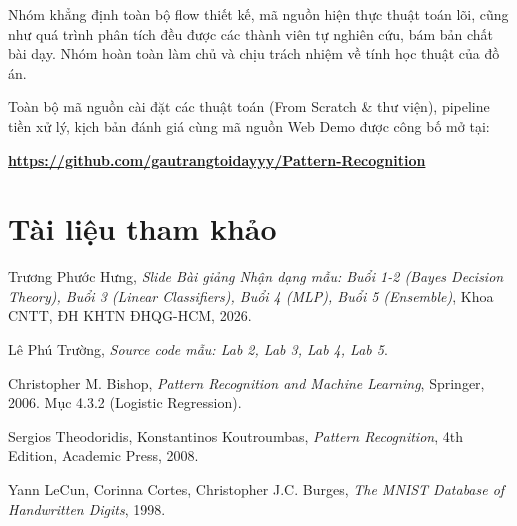\documentclass[11pt,a4paper]{article}
\begin{document}
Nhóm khẳng định toàn bộ flow thiết kế, mã nguồn hiện thực thuật toán lõi, cũng như quá trình phân tích đều được các thành viên tự nghiên cứu, bám bản chất bài dạy. Nhóm hoàn toàn làm chủ và chịu trách nhiệm về tính học thuật của đồ án.

\begin{tcolorbox}[colback=gray!8, colframe=black!75, title=\textbf{Mã nguồn và Tài nguyên Thực nghiệm (GitHub Repository)}, rounded corners, boxrule=0.8pt]
Toàn bộ mã nguồn cài đặt các thuật toán (From Scratch \& thư viện), pipeline tiền xử lý, kịch bản đánh giá cùng mã nguồn Web Demo được công bố mở tại:
\begin{center}
    \textbf{\url{https://github.com/gautrangtoidayyy/Pattern-Recognition}}
\end{center}
\end{tcolorbox}

\section*{Tài liệu tham khảo}
\begin{enumerate}[label={[\arabic*]}, noitemsep]
    \item Trương Phước Hưng, \textit{Slide Bài giảng Nhận dạng mẫu: Buổi 1-2 (Bayes Decision Theory), Buổi 3 (Linear Classifiers), Buổi 4 (MLP), Buổi 5 (Ensemble)}, Khoa CNTT, ĐH KHTN ĐHQG-HCM, 2026.
    \item Lê Phú Trường, \textit{Source code mẫu: Lab 2, Lab 3, Lab 4, Lab 5}.
    \item Christopher M. Bishop, \textit{Pattern Recognition and Machine Learning}, Springer, 2006. Mục 4.3.2 (Logistic Regression).
    \item Sergios Theodoridis, Konstantinos Koutroumbas, \textit{Pattern Recognition}, 4th Edition, Academic Press, 2008.
    \item Yann LeCun, Corinna Cortes, Christopher J.C. Burges, \textit{The MNIST Database of Handwritten Digits}, 1998.
\end{enumerate}
\end{document}
